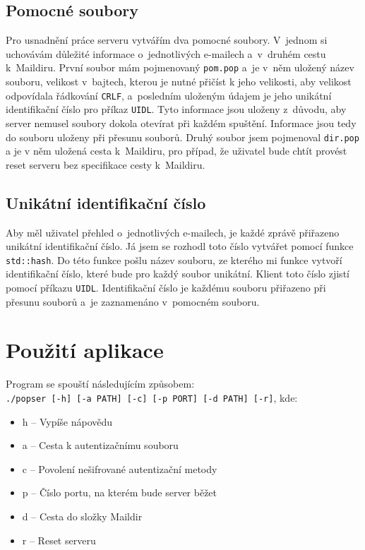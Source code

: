 \documentclass[a4paper, 11pt]{article}
\begin{document}
\subsection{Pomocné soubory}
Pro usnadnění práce serveru vytvářím dva pomocné soubory. V~jednom si uchovávám důležité informace o~jednotlivých e-mailech a~v~druhém cestu k~Maildiru. První soubor mám pojmenovaný \texttt{pom.pop} a~je v~něm uložený název souboru, velikost v~bajtech, kterou je nutné přičíst k jeho velikosti, aby velikost odpovídala řádkování \texttt{CRLF}, a~posledním uloženým údajem je jeho unikátní identifikační číslo pro příkaz \texttt{UIDL}. Tyto informace jsou uloženy z~důvodu, aby server nemusel soubory dokola otevírat při každém spuštění. Informace jsou tedy do souboru uloženy při přesunu souborů. Druhý soubor jsem pojmenoval \texttt{dir.pop} a je v něm uložená cesta k~Maildiru, pro případ, že uživatel bude chtít provést reset serveru bez specifikace cesty k~Maildiru.

\subsection{Unikátní identifikační číslo}
Aby měl uživatel přehled o~jednotlivých e-mailech, je každé zprávě přiřazeno unikátní identifikační číslo. Já jsem se rozhodl toto číslo vytvářet pomocí funkce \texttt{std::hash}. Do této funkce pošlu název souboru, ze kterého mi funkce vytvoří identifikační číslo, které bude pro každý soubor unikátní. Klient toto číslo zjistí pomocí příkazu \texttt{UIDL}. Identifikační číslo je každému souboru přiřazeno při přesunu souborů a~je zaznamenáno v~pomocném souboru.

\section{Použití aplikace}
Program se spouští následujícím způsobem:\\
\texttt{./popser [-h] [-a PATH] [-c] [-p PORT] [-d PATH] [-r]}, kde:
\begin{itemize}
\item h -- Vypíše nápovědu
\item a -- Cesta k autentizačnímu souboru
\item c -- Povolení nešifrované autentizační metody
\item p -- Číslo portu, na kterém bude server běžet
\item d -- Cesta do složky Maildir
\item r -- Reset serveru
\end{itemize}
\end{document}
